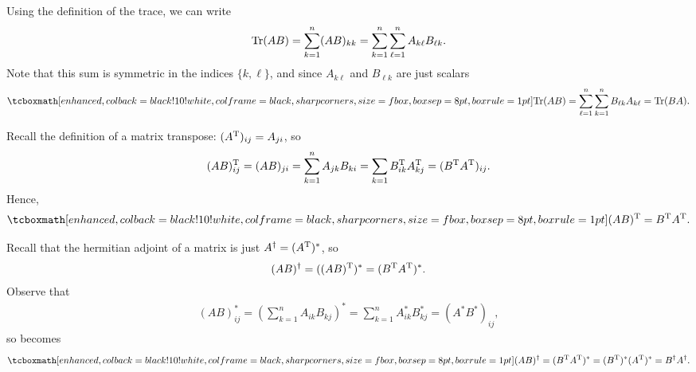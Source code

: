 \def\duedate{08/31/2022}
\def\HWnum{1}



    

Using the definition of the trace, we can write
\begin{eqnarray}
    \label{eq:trace-AB}
    {\rm Tr}(AB) = \sum_{k=1}^{n} (AB)_{kk} = \sum_{k=1}^{n} \sum_{\ell=1}^{n} A_{k\ell}B_{\ell k}
.\end{eqnarray}
Note that this sum is symmetric in the indices $\{ k,\ell \} $, and since $A_{k\ell}$ and $B_{\ell k}$ are just scalars 
\begin{eqnarray}
    \label{eq:trace-BA}
    \eqbox{
    {\rm Tr}(AB) = \sum_{\ell=1}^{n} \sum_{k=1}^{n} B_{\ell k}A_{k\ell} = {\rm Tr}(BA)
    } 
.\end{eqnarray}



Recall the definition of a matrix transpose: $(A^{\rm T})_{ij} = A_{ji}$, so
\begin{eqnarray}
    \label{eq:transpose-AB}
    (AB)^{\rm T}_{ij} = (AB)_{ji} = \sum_{k=1}^{n} A_{jk}B_{ki} = \sum_{k=1} B_{ik}^{\rm T} A_{kj}^{\rm T} = (B^{\rm T}A^{\rm T})_{ij}
.\end{eqnarray}
Hence,
\begin{eqnarray}
    \label{eq:prob3-result}
    \eqbox{
    (AB)^{\rm T} = B^{\rm T}A^{\rm T}
    }
.\end{eqnarray}




Recall that the hermitian adjoint of a matrix is just $A^{\dagger} = (A^{\rm T})^{*}$, so
\begin{eqnarray}
    \label{eq:adjoint-AB}
    (AB)^{\dagger} = ((AB)^{\rm T})^{*} = (B^{\rm T}A^{\rm T})^{*}
.\end{eqnarray}
Observe that 
\begin{eqnarray}
    \label{eq:complex-conj-product}
    (AB)^{*}_{ij} = \left( \sum_{k=1}^{n} A_{ik}B_{kj} \right)^{*} = \sum_{k=1}^{n} A^{*}_{ik}B^{*}_{kj} = (A^{*}B^{*})_{ij}
,\end{eqnarray}
so  becomes
\begin{eqnarray}
    \label{eq:adjoint-BA}
    \eqbox{
        (AB)^{\dagger} = (B^{\rm T}A^{\rm T})^{*} = (B^{\rm T})^{*}(A^{\rm T})^{*} = B^{\dagger}A^{\dagger}
    }
.\end{eqnarray}



